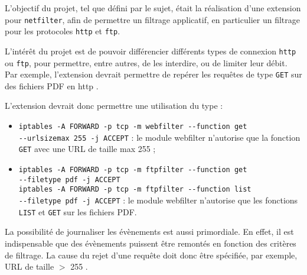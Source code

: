 L'objectif du projet, tel que défini par le sujet, était la réalisation d'une extension
pour \verb+netfilter+, afin de permettre un filtrage applicatif, en particulier un filtrage
pour les protocoles \verb+http+ et \verb+ftp+.

L'intérêt du projet est de pouvoir différencier différents types de connexion \verb+http+ ou \verb+ftp+,
pour permettre, entre autres, de les interdire, ou de limiter leur débit. Par exemple, l'extension
devrait permettre de repérer \og les requêtes de type \verb+GET+ sur des fichiers PDF en http \fg{}.

L'extension devrait donc permettre une utilisation du type :
\begin{itemize}
\item \verb+iptables -A FORWARD -p tcp -m webfilter --function get+\\ \verb+--urlsizemax 255 -j ACCEPT+ : le module \og webfilter \fg{} n'autorise que la fonction \verb+GET+ avec une URL de taille max 255 ;
\item \verb+iptables -A FORWARD -p tcp -m ftpfilter --function get+\\
\verb+--filetype pdf -j ACCEPT+\\
\verb+iptables -A FORWARD -p tcp -m ftpfilter --function list+\\
\verb+--filetype pdf -j ACCEPT+ : le module \og webfilter \fg{} n'autorise que les fonctions \verb+LIST+ et \verb+GET+ sur les fichiers PDF.
\end{itemize}

La possibilité de journaliser les évènements est aussi primordiale. En effet, il est indispensable que des évènements puissent être remontés en fonction des critères de filtrage. La cause du rejet d'une requête doit donc être spécifiée, par exemple, \og URL de taille $>$ 255 \fg{}.
